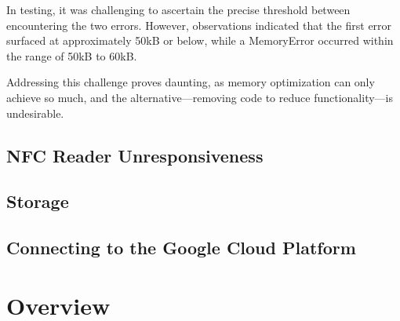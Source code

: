 In testing, it was challenging to ascertain the precise threshold between encountering the two 
errors. However, observations indicated that the first error surfaced at approximately 50kB or 
below, while a MemoryError occurred within the range of 50kB to 60kB.

Addressing this challenge proves daunting, as memory optimization can only achieve so much, and the 
alternative—removing code to reduce functionality—is undesirable.



\subsection{NFC Reader Unresponsiveness}

\subsection{Storage}

\subsection{Connecting to the Google Cloud Platform}


\section{Overview}
